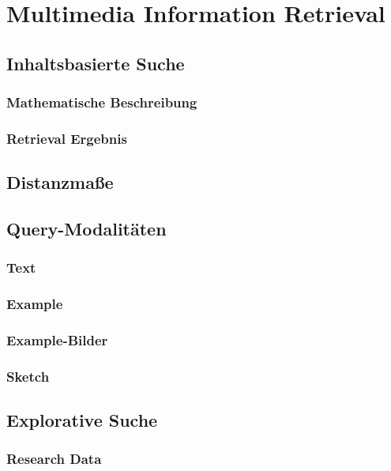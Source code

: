 \documentclass[a4paper, 11pt, accentcolor = tud3b]{tudreport}
\begin{document}
	\chapter{Multimedia Information Retrieval} %

		\section{Inhaltsbasierte Suche} %

			\subsection{Mathematische Beschreibung} %

			\subsection{Retrieval Ergebnis} %

		\section{Distanzmaße} %

		\section{Query-Modalitäten} %

			\subsection{Text} %

			\subsection{Example} %

			\subsection{Example-Bilder} %

			\subsection{Sketch} %

		\section{Explorative Suche} %

			\subsection{Research Data} %
\end{document}
